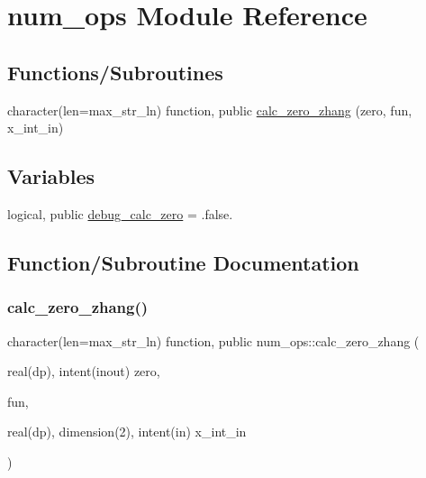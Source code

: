 \hypertarget{namespacenum__ops}{}\section{num\+\_\+ops Module Reference}
\label{namespacenum__ops}
\subsection*{Functions/\+Subroutines}
\begin{DoxyCompactItemize}
\item 
character(len=max\+\_\+str\+\_\+ln) function, public \hyperlink{namespacenum__ops_adcc4eacf15c931744316a004f4448b90}{calc\+\_\+zero\+\_\+zhang} (zero, fun, x\+\_\+int\+\_\+in)
\end{DoxyCompactItemize}
\subsection*{Variables}
\begin{DoxyCompactItemize}
\item 
logical, public \hyperlink{namespacenum__ops_aca06cb91f215c46429e23fbaf8611e5a}{debug\+\_\+calc\+\_\+zero} = .false.
\end{DoxyCompactItemize}


\subsection{Function/\+Subroutine Documentation}
\mbox{\label{namespacenum__ops_adcc4eacf15c931744316a004f4448b90}} 
\subsubsection{\texorpdfstring{calc\+\_\+zero\+\_\+zhang()}{calc\_zero\_zhang()}}
{\footnotesize\ttfamily character(len=max\+\_\+str\+\_\+ln) function, public num\+\_\+ops\+::calc\+\_\+zero\+\_\+zhang (\begin{DoxyParamCaption}\item[{real(dp), intent(inout)}]{zero,  }\item[{}]{fun,  }\item[{real(dp), dimension(2), intent(in)}]{x\+\_\+int\+\_\+in }\end{DoxyParamCaption})}



